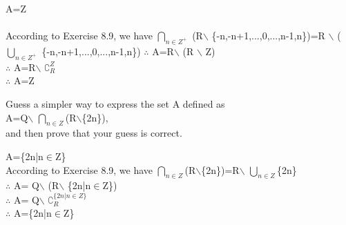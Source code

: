 \documentclass[11pt, a4paper, UTF8]{ctexart}
\begin{document}
\begin{solution}
A=Z\\
\\
According to Exercise 8.9, we have $\bigcap_{n \in Z^+}$ (R$\backslash$ \{-n,-n+1,...,0,...,n-1,n\})=R $\backslash$ ($\bigcup_{n\in Z^+}$ \{-n,-n+1,...,0,...,n-1,n\})
$\therefore$ A=R$\backslash$ (R $\backslash$ Z)\\
$\therefore$ A=R$\backslash$ $\complement_{R}^{Z}$\\
$\therefore$ A=Z
\end{solution}



\begin{problem}[UD:8.9]
Guess a simpler way to express the set A defined as\\
\indent \indent A=Q$\backslash$ $\bigcap_{n\in Z}$(R$\backslash$\{2n\}),\\
and then prove that your guess is correct.
\end{problem}



\begin{solution}
A=\{2n|n$\in$Z\}\\
According to Exercise 8.9, we have $\bigcap_{n\in Z}$(R$\backslash$\{2n\})=R$\backslash$ $\bigcup_{n \in Z}$\{2n\}\\
$\therefore$ A= Q$\backslash$ (R$\backslash$ \{2n|n$\in$Z\})\\
$\therefore$ A= Q$\backslash$ $\complement_{R}^{\{2n|n \in Z\}}$\\
$\therefore$ A=\{2n|n$\in$Z\}\\
\end{solution}
\end{document}
